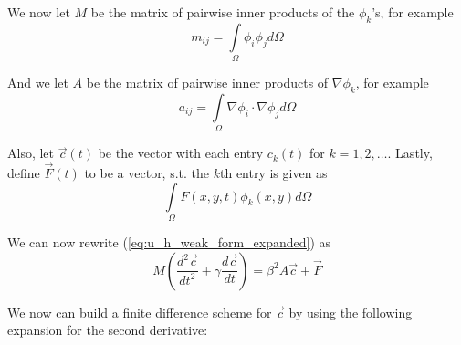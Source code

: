 \documentclass[a4paper,12pt]{article}
\begin{document}
We now let $M$ be the matrix of pairwise inner products of the $\phi_k$'s, for example
\begin{equation} \label{eq:m_definition}
m_{ij} = \int\limits_{\Omega} \phi_i \phi_j d\Omega
\end{equation}

And we let $A$ be the matrix of pairwise inner products of $\nabla \phi_k$, for example
\begin{equation} \label{eq:a_definition}
a_{ij} = \int\limits_{\Omega} \nabla \phi_i \cdot \nabla \phi_j d\Omega
\end{equation}

Also, let $\vec{c}(t)$ be the vector with each entry $c_k(t)$ for $k=1, 2, \ldots$. Lastly, define
$\vec{F}(t)$ to be a vector, s.t. the $k$th entry is given as 
\begin{equation} \label{eq:vec_F_definition}
\int\limits_{\Omega} F(x,y,t) \phi_k(x,y) d\Omega
\end{equation}

We can now rewrite (\ref{eq:u_h_weak_form_expanded}) as
\begin{equation} \label{eq:u_h_matrix}
M\left( \frac{d^2\vec{c}}{dt^2} + \gamma\frac{d\vec{c}}{dt} \right) = \beta^2 A \vec{c} + \vec{F}
\end{equation}

We now can build a finite difference scheme for $\vec{c}$ by using the following expansion for the second derivative:
\begin{equation} \label{eq:second_derivative_finite_difference}
\end{equation}
\end{document}
